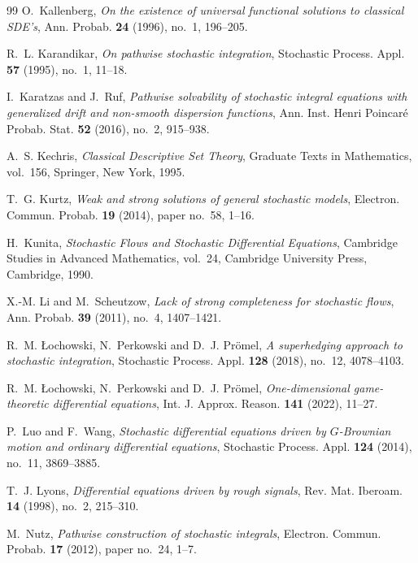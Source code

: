 \documentclass[11pt,reqno]{amsart}
\theoremstyle{plain}
\theoremstyle{definition}
\begin{document}
\begin{thebibliography}{99}
O.~Kallenberg,
\emph{On the existence of universal functional solutions to classical
SDE's},
Ann. Probab. \textbf{24} (1996), no.~1, 196--205.

R.~L. Karandikar,
\emph{On pathwise stochastic integration},
Stochastic Process. Appl. \textbf{57} (1995), no.~1, 11--18.

I.~Karatzas and J.~Ruf,
\emph{Pathwise solvability of stochastic integral equations with generalized
drift and non-smooth dispersion functions},
Ann. Inst. Henri Poincar\'e Probab. Stat. \textbf{52} (2016), no.~2,
915--938.

A.~S. Kechris,
\emph{Classical Descriptive Set Theory},
Graduate Texts in Mathematics, vol.~156, Springer, New York, 1995.

T.~G. Kurtz,
\emph{Weak and strong solutions of general stochastic models},
Electron. Commun. Probab. \textbf{19} (2014), paper no.~58, 1--16.

H.~Kunita,
\emph{Stochastic Flows and Stochastic Differential Equations},
Cambridge Studies in Advanced Mathematics, vol.~24,
Cambridge University Press, Cambridge, 1990.

X.-M. Li and M.~Scheutzow,
\emph{Lack of strong completeness for stochastic flows},
Ann. Probab. \textbf{39} (2011), no.~4, 1407--1421.

R.~M. {\L}ochowski, N.~Perkowski and D.~J. Pr\"omel,
\emph{A superhedging approach to stochastic integration},
Stochastic Process. Appl. \textbf{128} (2018), no.~12, 4078--4103.

R.~M. {\L}ochowski, N.~Perkowski and D.~J. Pr\"omel,
\emph{One-dimensional game-theoretic differential equations},
Int. J. Approx. Reason. \textbf{141} (2022), 11--27.

P.~Luo and F.~Wang,
\emph{Stochastic differential equations driven by \(G\)-Brownian motion
and ordinary differential equations},
Stochastic Process. Appl. \textbf{124} (2014), no.~11, 3869--3885.

T.~J. Lyons,
\emph{Differential equations driven by rough signals},
Rev. Mat. Iberoam. \textbf{14} (1998), no.~2, 215--310.

M.~Nutz,
\emph{Pathwise construction of stochastic integrals},
Electron. Commun. Probab. \textbf{17} (2012), paper no.~24, 1--7.


\end{thebibliography}
\end{document}

